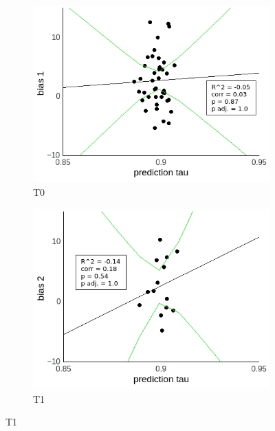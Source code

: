 \documentclass[a4paper]{scrreprt}
\begin{document}
\begin{figure}
\centering
\begin{subfigure}[b]{0.49\textwidth}
        \includegraphics[width=\textwidth]{figs/sec3/pred/predno_diff_1_mod2dat.jpeg}
        \caption{T0}
    \end{subfigure}
    \begin{subfigure}[b]{0.49\textwidth}
        \includegraphics[width=\textwidth]{figs/sec3/pred/predno_diff_2_mod2dat.jpeg}
        \caption{T1}
    \end{subfigure}


\end{figure}
\end{document}
